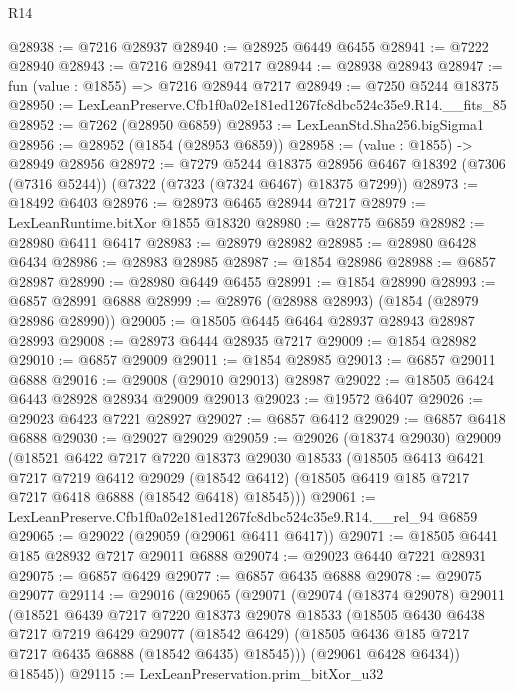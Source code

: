 \begin{lexlean}{R14}
\begin{coremodule}
@28938 := @7216 @28937
@28940 := @28925 @6449 @6455
@28941 := @7222 @28940
@28943 := @7216 @28941 @7217
@28944 := @28938 @28943
@28947 := fun (value : @1855) => @7216 @28944 @7217
@28949 := @7250 @5244 @18375
@28950 := LexLeanPreserve.Cfb1f0a02e181ed1267fc8dbc524c35e9.R14.__fits_85
@28952 := @7262 (@28950 @6859)
@28953 := LexLeanStd.Sha256.bigSigma1
@28956 := @28952 (@1854 (@28953 @6859))
@28958 := (value : @1855) -> @28949 @28956
@28972 := @7279
    @5244
    @18375
    @28956
    @6467
    @18392
    (@7306 (@7316 @5244))
    (@7322 (@7323 (@7324 @6467) @18375 @7299))
@28973 := @18492 @6403
@28976 := @28973 @6465 @28944 @7217
@28979 := LexLeanRuntime.bitXor @1855 @18320
@28980 := @28775 @6859
@28982 := @28980 @6411 @6417
@28983 := @28979 @28982
@28985 := @28980 @6428 @6434
@28986 := @28983 @28985
@28987 := @1854 @28986
@28988 := @6857 @28987
@28990 := @28980 @6449 @6455
@28991 := @1854 @28990
@28993 := @6857 @28991 @6888
@28999 := @28976 (@28988 @28993) (@1854 (@28979 @28986 @28990))
@29005 := @18505 @6445 @6464 @28937 @28943 @28987 @28993
@29008 := @28973 @6444 @28935 @7217
@29009 := @1854 @28982
@29010 := @6857 @29009
@29011 := @1854 @28985
@29013 := @6857 @29011 @6888
@29016 := @29008 (@29010 @29013) @28987
@29022 := @18505 @6424 @6443 @28928 @28934 @29009 @29013
@29023 := @19572 @6407
@29026 := @29023 @6423 @7221 @28927
@29027 := @6857 @6412
@29029 := @6857 @6418 @6888
@29030 := @29027 @29029
@29059 := @29026
    (@18374 @29030)
    @29009
    (@18521
      @6422
      @7217
      @7220
      @18373
      @29030
      @18533
      (@18505
        @6413
        @6421
        @7217
        @7219
        @6412
        @29029
        (@18542 @6412)
        (@18505 @6419 @185 @7217 @7217 @6418 @6888 (@18542 @6418) @18545)))
@29061 := LexLeanPreserve.Cfb1f0a02e181ed1267fc8dbc524c35e9.R14.__rel_94 @6859
@29065 := @29022 (@29059 (@29061 @6411 @6417))
@29071 := @18505 @6441 @185 @28932 @7217 @29011 @6888
@29074 := @29023 @6440 @7221 @28931
@29075 := @6857 @6429
@29077 := @6857 @6435 @6888
@29078 := @29075 @29077
@29114 := @29016
    (@29065
      (@29071
        (@29074
          (@18374 @29078)
          @29011
          (@18521
            @6439
            @7217
            @7220
            @18373
            @29078
            @18533
            (@18505
              @6430
              @6438
              @7217
              @7219
              @6429
              @29077
              (@18542 @6429)
              (@18505 @6436 @185 @7217 @7217 @6435 @6888 (@18542 @6435) @18545)))
          (@29061 @6428 @6434))
        @18545))
@29115 := LexLeanPreservation.prim_bitXor_u32

\end{coremodule}
\end{lexlean}
